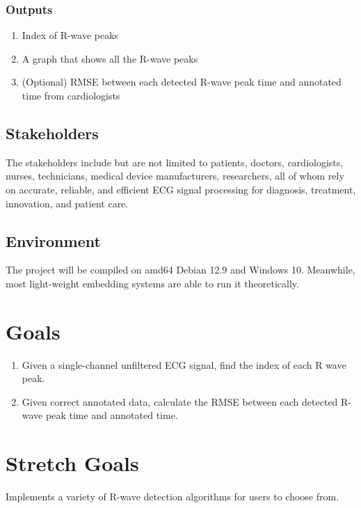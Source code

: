 \documentclass{article}
\begin{document}
\subsubsection{Outputs}

\begin{enumerate}
    \item Index of R-wave peaks
    \item A graph that shows all the R-wave peaks
    \item (Optional) RMSE between each detected R-wave peak time and annotated time from cardiologists
\end{enumerate}

\subsection{Stakeholders}

The stakeholders include but are not limited to patients, doctors, cardiologists, nurses, technicians, medical device manufacturers, researchers, all of whom rely on accurate, reliable, and efficient ECG signal processing for diagnosis, treatment, innovation, and patient care.

\subsection{Environment}

The project will be compiled on amd64 Debian 12.9 and Windows 10. Meanwhile, most light-weight embedding systems are able to run it theoretically.

\section{Goals}

\begin{enumerate}
    \item Given a single-channel unfiltered ECG signal, find the index of each R wave peak.
    \item Given correct annotated data, calculate the RMSE between each detected R-wave peak time and annotated time.
\end{enumerate}

\section{Stretch Goals}

Implements a variety of R-wave detection algorithms for users to choose from.
\end{document}
